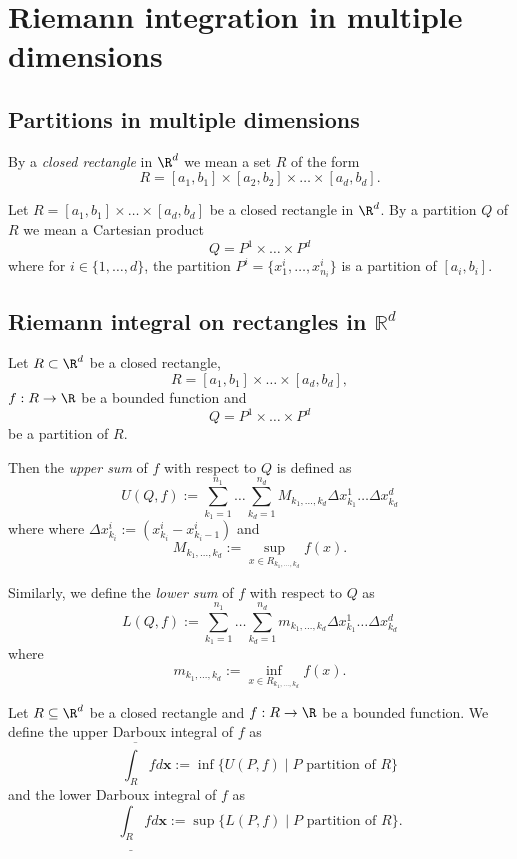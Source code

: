 \section{Riemann integration in multiple dimensions}

\subsection{Partitions in multiple dimensions}
\begin{definition}
    By a \emph{closed rectangle} in $\R^d$ we mean a set $R$ of the form
    $$R = [a_1,b_1] \times [a_2,b_2] \times \dots \times [a_d,b_d].$$
\end{definition}

\begin{definition}
    Let $R = [a_1,b_1] \times \dots \times [a_d,b_d]$ be a closed rectangle in $\R^d$.
    By a partition $Q$ of $R$ we mean a Cartesian product 
    $$Q = P^1 \times \dots \times P^d$$
    where for $i \in \{1,\dots,d\}$, the partition $P^i = \{x_1^i,\dots,x_{n_i}^i\}$ is
    a partition of $[a_i,b_i]$.
\end{definition}

\subsection{Riemann integral on rectangles in \texorpdfstring{$\mathbb{R}^d$}{Rd}}
\begin{definition}
    Let $R \subset \R^d$ be a closed rectangle,
    $$R = [a_1,b_1] \times \dots \times [a_d,b_d],$$
    $f:R \to \R$ be a bounded function and 
    $$Q = P^1 \times \dots \times P^d$$
    be a partition of $R$.

    Then the \emph{upper sum} of $f$ with respect to $Q$ is defined as
    $$U(Q,f) := \sum_{k_1=1}^{n_1} \dots \sum_{k_d=1}^{n_d} M_{k_1,\dots,k_d} \Delta x_{k_1}^1 \dots \Delta x_{k_d}^d$$
    where
    where $\Delta x_{k_i}^i := (x_{k_i}^i - x_{k_i-1}^i)$ and
    $$M_{k_1,\dots,k_d} := \sup_{x \in R_{k_1,\dots,k_d}} f(x).$$

    Similarly, we define the \emph{lower sum} of $f$ with respect to $Q$ as
    $$L(Q,f) := \sum_{k_1=1}^{n_1} \dots \sum_{k_d=1}^{n_d} m_{k_1,\dots,k_d} \Delta x_{k_1}^1 \dots \Delta x_{k_d}^d$$
    where
    $$m_{k_1,\dots,k_d} := \inf_{x \in R_{k_1,\dots,k_d}} f(x).$$
\end{definition}

\begin{definition}
    Let $R \subseteq \R^d$ be a closed rectangle and $f:R \to \R$ be a bounded function.
    We define the upper Darboux integral of $f$ as 
    $$\overline{\int_R} f d\mathbf{x} := \inf\{U(P,f) \mid P \text{ partition of } R\}$$
    and the lower Darboux integral of $f$ as
    $$\underline{\int_R} f d\mathbf{x} := \sup\{L(P,f) \mid P \text{ partition of } R\}.$$
\end{definition}

